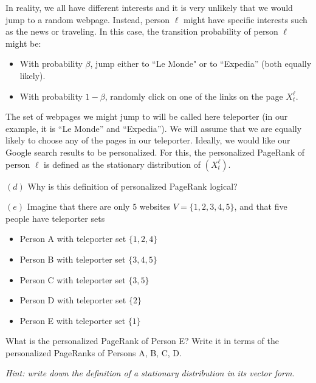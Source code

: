 \documentclass{article}
\begin{document}
\begin{tcolorbox}[colback = gray!16, enhanced, boxrule=0pt, frame hidden, sharp corners, borderline west={3pt}{-1.5pt}{black!80},breakable]
In reality, we all have different interests and it is very unlikely that we would jump to a random webpage. Instead, person $\ell$ might have specific interests such as the news or traveling. In this case, the transition probability of person $\ell$ might be: \begin{itemize} \item With probability $\beta$, jump either to ``Le Monde" or to ``Expedia'' (both equally likely).
\item With probability $1-\beta$, randomly click on one of the links on the page $X^{\ell}_t$. \end{itemize}

The set of webpages we might jump to will be called here teleporter (in our example, it is ``Le Monde'' and ``Expedia''). We will assume that we are equally likely to choose any of the pages in our teleporter. Ideally, we would like our Google search results to be personalized. For this, the personalized PageRank of person $\ell$ is defined as the stationary distribution of $(X_t^\ell)$.\newpar 

$(d)$ Why is this definition of personalized PageRank logical?\newpar

$(e)$ Imagine that there are only $5$ websites $V = \{1,2,3,4,5\}$, and that five people have teleporter sets
\begin{itemize}
    \item Person A with teleporter set $\{1,2,4\}$
    \item Person B with teleporter set $\{3,4,5\}$
     \item Person C with teleporter set $\{3,5\}$
     \item  Person D with teleporter set $\{2\}$
     \item Person E with teleporter set $\{1\}$
\end{itemize}
What is the personalized PageRank of Person E? Write it in terms of the personalized PageRanks of Persons A, B, C, D.\newpar

\textit{Hint: write down the definition of a stationary distribution in its vector form}.
\end{tcolorbox}
\end{document}
